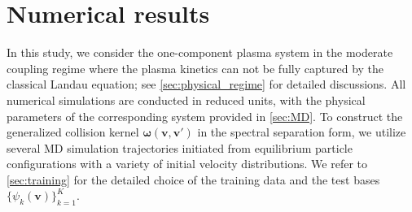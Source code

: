 \documentclass[preprint,1p,times]{elsarticle}
\theoremstyle{definition}
\theoremstyle{remark}
\begin{document}

\section{Numerical results}\label{sec:numerical}

In this study, we consider the one-component plasma system in the moderate coupling regime where the plasma kinetics can not be fully captured by the classical Landau equation; see \ref{sec:physical_regime} for detailed discussions.  
%
All numerical simulations are conducted in reduced units, with the physical parameters of the corresponding system provided in \ref{sec:MD}. 
%
To construct the generalized collision kernel $\boldsymbol{\omega}(\boldsymbol{v}, \boldsymbol{v}')$ in the spectral separation form, we utilize several MD simulation trajectories initiated from equilibrium particle configurations with a variety of initial velocity distributions. We refer to \ref{sec:training} for the detailed choice of the training data and the test bases $\{\psi_k(\boldsymbol{v})\}_{k=1}^K$. 
\end{document}
